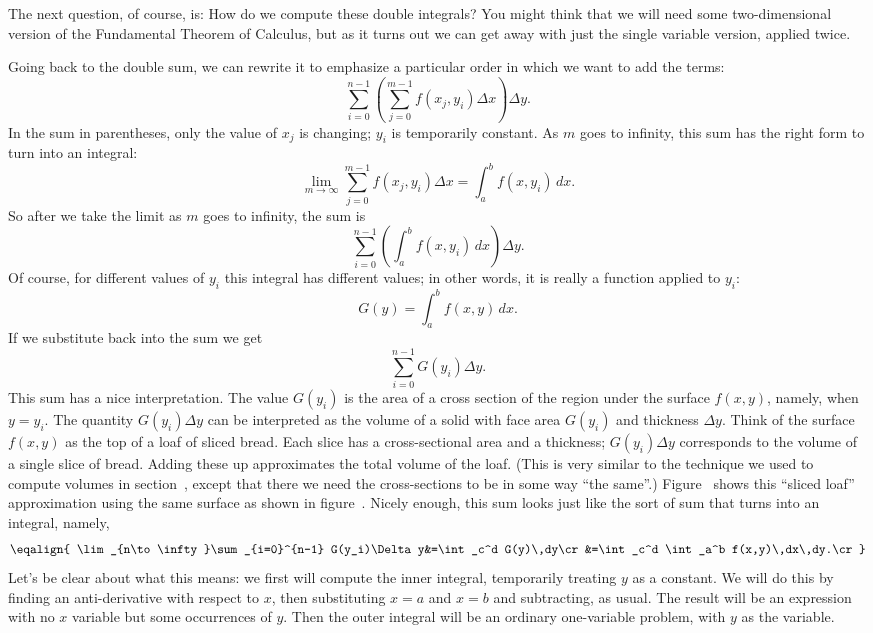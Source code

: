The next question, of course, is: How do we compute these double
integrals? You might think that we will need some two-dimensional
version of the Fundamental Theorem of Calculus, but as it turns out we
can get away with just the single variable version, applied twice.

Going back to the double sum, we can rewrite it to emphasize a
particular order in which we want to add the terms:
$$\sum_{i=0}^{n-1}\left(\sum_{j=0}^{m-1}f(x_j,y_i)\Delta
  x\right)\Delta y.$$
In the sum in parentheses, only the value of $x_j$ is changing; $y_i$
is temporarily constant. As $m$  goes to infinity, this sum has the
right form to turn into an integral:
$$\lim_{m\to\infty}\sum_{j=0}^{m-1}f(x_j,y_i)\Delta
  x = \int_a^b f(x,y_i)\,dx.$$
So after we take the limit as $m$ goes to infinity, the sum
is
$$
\sum_{i=0}^{n-1}\left(\int_a^b f(x,y_i)\,dx\right)\Delta y.
$$
Of course, for different values of $y_i$ this integral has different
values; in other words, it is really a function applied to $y_i$:
$$G(y)=\int_a^b f(x,y)\,dx.$$
If we substitute back into the sum we get
$$\sum_{i=0}^{n-1} G(y_i)\Delta y.$$
This sum has a nice interpretation. The value $G(y_i)$ is the area of
a cross section of the region under the surface $f(x,y)$, namely, when
$y=y_i$. The quantity $G(y_i)\Delta y$ can be interpreted as the
volume of a solid with face area $G(y_i)$ and thickness $\Delta
y$. Think of the surface $f(x,y)$ as the top of a loaf of sliced
bread. Each slice has a cross-sectional area and a thickness;
$G(y_i)\Delta y$ corresponds to the volume of a single slice of
bread. Adding these up approximates the total volume of the loaf. (This is
very similar to the technique we used to compute volumes in
section~, 
except that there we need the cross-sections to be in
some way ``the same''.) Figure~ 
shows this ``sliced loaf''
approximation using the same surface as shown in 
figure~.
Nicely enough, this sum looks just like the sort of sum that turns into an
integral, namely,
$$\eqalign{
\lim_{n\to\infty}\sum_{i=0}^{n-1} G(y_i)\Delta y&=\int_c^d
G(y)\,dy\cr
&=\int_c^d \int_a^b f(x,y)\,dx\,dy.\cr
}$$
Let's be clear about what this means: we first will compute the inner
integral, temporarily treating $y$ as a constant. We will do this by
finding an anti-derivative with respect to $x$, then substituting
$x=a$ and $x=b$ and subtracting, as usual. The result will be an
expression with no $x$ variable but some occurrences of $y$. Then the
outer integral will be an ordinary one-variable problem, with $y$ as
the variable.

